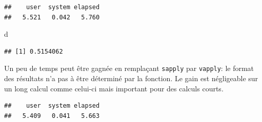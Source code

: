 \documentclass[
  12pt,
  french,
  a4paper,
  extrafontsizes,onecolumn,openright
  ]{memoir}
\newenvironment{Shaded}{\begin{snugshade}}{\end{snugshade}}
\newcommand{\ControlFlowTok}[1]{\textcolor[rgb]{0.13,0.29,0.53}{\textbf{#1}}}
\newcommand{\DecValTok}[1]{\textcolor[rgb]{0.00,0.00,0.81}{#1}}
\newcommand{\KeywordTok}[1]{\textcolor[rgb]{0.13,0.29,0.53}{\textbf{#1}}}
\newcommand{\NormalTok}[1]{#1}
\newcommand{\OperatorTok}[1]{\textcolor[rgb]{0.81,0.36,0.00}{\textbf{#1}}}
\newcommand{\StringTok}[1]{\textcolor[rgb]{0.31,0.60,0.02}{#1}}
\begin{document}
\begin{verbatim}
##    user  system elapsed 
##   5.521   0.042   5.760
\end{verbatim}

\begin{Shaded}
\begin{Highlighting}[]
\NormalTok{d}
\end{Highlighting}
\end{Shaded}

\begin{verbatim}
## [1] 0.5154062
\end{verbatim}

\normalsize

Un peu de temps peut être gagnée en remplaçant \texttt{sapply} par \texttt{vapply}: le format des résultats n'a pas à être déterminé par la fonction.
Le gain est négligeable sur un long calcul comme celui-ci mais important pour des calculs courts.

\scriptsize

\begin{Shaded}
\end{Shaded}

\begin{verbatim}
##    user  system elapsed 
##   5.409   0.041   5.663
\end{verbatim}
\end{document}
